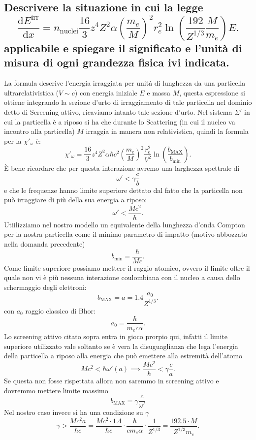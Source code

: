 \subsection[]{Descrivere la situazione in cui la legge
\[
	\frac{\mbox{d}E^{\text{irr}}}{\mbox{d}x}=
	n_{\text{nuclei}}\frac{16}{3}z^4Z^2\alpha\left(\frac{m_e}{M}\right)^2r_e^2\ln\left(\frac{192}{Z^{1 /3}}\frac{M}{m_e}\right) E
.\] 
applicabile e spiegare il significato e l'unità di misura di ogni grandezza fisica ivi indicata.
}\label{sec:4.a.15}
La formula descrive l'energia irraggiata per unità di lunghezza da una particella ultrarelativistica ($V \sim c$) con energia iniziale $E$ e massa $M$, questa espressione si ottiene integrando la sezione d'urto di irraggiamento di tale particella nel dominio detto di Screening attivo, ricaviamo intanto tale sezione d'urto. Nel sistema $\Sigma'$ in cui la particella è a riposo si ha che durante lo Scattering (in cui il nucleo va incontro alla particella) $M$ irraggia in manera non relativistica, quindi la formula per la $\chi'_{\omega}$ è:
\[
	\chi'_{\omega}=\frac{16}{3}z^4Z^2\alpha\hbar c^2 \left( \frac{m_e}{M} \right)^2  \frac{r^2_e}{V^2}\ln\left( \frac{b_{\text{MAX}}}{b_{\text{min}}} \right) 
.\] 
È bene ricordare che per questa interazione avremo una larghezza spettrale di \[
	\omega'< \gamma \frac{c}{b}
\] e che le frequenze hanno limite superiore dettato dal fatto che la particella non può irraggiare di più della sua energia a riposo:
\[
	\omega'< \frac{M c^2}{\hbar}
.\] 
Utiilizziamo nel nostro modello un equivalente della lunghezza d'onda Compton per la nostra particella come il minimo parametro di impatto (motivo abbozzato nella domanda precedente)
\[
	b_{\text{min}}= \frac{\hbar}{Mc}
.\] 
Come limite superiore possiamo mettere il raggio atomico, ovvero il limite oltre il quale non vi è più nessuna interazione coulombiana con il nucleo a causa dello schermaggio degli elettroni:
\[
	b_{\text{MAX}}=a= 1.4 \frac{a_0}{Z^{1 /3}}
.\] 
con $a_0$ raggio classico di Bhor:
 \[
	 a_0 = \frac{\hbar}{m_e c \alpha}
.\] 
Lo screening attivo citato sopra entra in gioco prorpio qui, infatti il limite superiore utilizzato vale soltanto se è vera la disuguaglianza che lega l'energia della particella a riposo alla energia che può emettere alla estremità dell'atomo \[
	Mc^2 < \hbar \omega'\left( a \right)  \implies \frac{M c^2}{\hbar} < \gamma \frac{c}{a}
.\] 
Se questa non fosse rispettata allora non saremmo in screening attivo e dovremmo mettere limite massimo \[b_{\text{MAX}} = \gamma \frac{c}{\omega'}\]
Nel nostro caso invece si ha una condizione su $\gamma$
\[
	\gamma > \frac{M c^2 a}{\hbar c} = \frac{M c^2 \cdot 1.4}{\hbar c}\cdot \frac{\hbar}{c m_e \alpha}\cdot \frac{1}{Z^{1 /3}} = \frac{192.5 \cdot M}{Z^{1 /3}m_e}
.\] 
